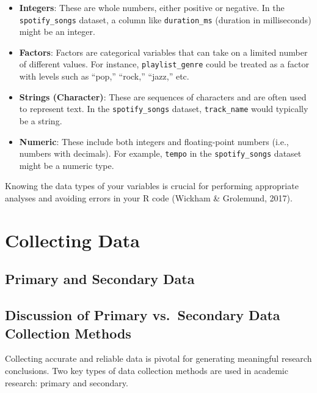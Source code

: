 \documentclass[
  b5paper]{book}
\begin{document}
\begin{itemize}
\item
  \textbf{Integers}: These are whole numbers, either positive or negative. In the \texttt{spotify\_songs} dataset, a column like \texttt{duration\_ms} (duration in milliseconds) might be an integer.
\item
  \textbf{Factors}: Factors are categorical variables that can take on a limited number of different values. For instance, \texttt{playlist\_genre} could be treated as a factor with levels such as ``pop,'' ``rock,'' ``jazz,'' etc.
\item
  \textbf{Strings (Character)}: These are sequences of characters and are often used to represent text. In the \texttt{spotify\_songs} dataset, \texttt{track\_name} would typically be a string.
\item
  \textbf{Numeric}: These include both integers and floating-point numbers (i.e., numbers with decimals). For example, \texttt{tempo} in the \texttt{spotify\_songs} dataset might be a numeric type.
\end{itemize}

Knowing the data types of your variables is crucial for performing appropriate analyses and avoiding errors in your R code (Wickham \& Grolemund, 2017).

\hypertarget{collecting-data}{%
\section{Collecting Data}\label{collecting-data}}

\hypertarget{primary-and-secondary-data}{%
\subsection*{Primary and Secondary Data}\label{primary-and-secondary-data}}

\hypertarget{discussion-of-primary-vs.-secondary-data-collection-methods}{%
\subsection*{Discussion of Primary vs.~Secondary Data Collection Methods}\label{discussion-of-primary-vs.-secondary-data-collection-methods}}

Collecting accurate and reliable data is pivotal for generating meaningful research conclusions. Two key types of data collection methods are used in academic research: primary and secondary.
\end{document}
